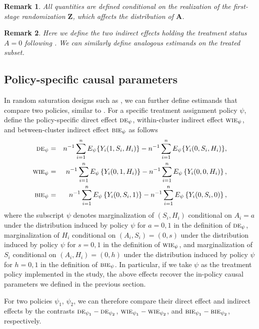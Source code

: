 \documentclass{article}
\newtheorem{remark}{Remark}[section]
\newcommand{\bZ}{\boldsymbol{Z}}
\newcommand{\bA}{\boldsymbol{A}}
\newcommand{\sumi}{\sum_{i=1}^n}
\newcommand{\de}{\textsc{de}}
\newcommand{\bie}{\textsc{bie}}
\newcommand{\wie}{\textsc{wie}}
\begin{document}
\begin{remark}
    All quantities are defined conditional on the realization of the first-stage randomization $\bZ$, which affects the distribution of $\bA$.
\end{remark}

\begin{remark}
    Here we define the two indirect effects holding the treatment status $A=0$ following \cite{hudgens2008toward}. We can similarly define analogous estimands on the treated subset.
\end{remark}

\subsection{Policy-specific causal parameters}
In random saturation designs such as \cite{egger2022general}, we can further define estimands that compare two policies, similar to \cite{hudgens2008toward}. For a specific treatment assignment policy $\psi$, define the policy-specific direct effect $\de_{\psi}$, within-cluster indirect effect $\wie_{\psi}$, and between-cluster indirect effect $\bie_{\psi}$ as follows
\begin{eqnarray*}
    \de_{\psi} &=& n^{-1}\sumi E_{\psi}\{Y_i(1,S_i,H_i)\} - n^{-1}\sumi E_{\psi}\{Y_i(0,S_i,H_i)\}, \\
    \wie_{\psi} &=& n^{-1}\sumi E_{\psi}\left\{Y_{i}(0,1,H_{i})\right\} - n^{-1}\sumi E_{\psi}\left\{Y_{i}(0,0,H_{i})\right\}, \\
    \bie_{\psi} &=& n^{-1}\sumi E_{\psi}\left\{Y_{i}(0,S_{i},1)\right\} - n^{-1}\sumi E_{\psi}\left\{Y_{i}(0,S_{i},0)\right\},
\end{eqnarray*}
where the subscript $\psi$ denotes marginalization of $(S_{i}, H_{i})$ conditional on $A_{i} = a$ under the distribution induced by policy $\psi$ for $a=0,1$ in the definition of $\de_{\psi}$, marginalization of $H_{i}$ conditional on $(A_{i},S_{i}) = (0,s)$ under the distribution induced by policy $\psi$ for $s=0,1$ in the definition of $\wie_{\psi}$, and marginalization of $S_{i}$ conditional on $(A_{i},H_{i}) = (0,h)$ under the distribution induced by policy $\psi$ for $h=0,1$ in the definition of $\bie_{\psi}$. In particular, if we take $\psi$ as the treatment policy implemented in the study, the above effects recover the in-policy causal parameters we defined in the previous section. 

For two policies $\psi_1$, $\psi_2$, we can therefore compare their direct effect and indirect effects by the contrasts $\de_{\psi_1} - \de_{\psi_2}$, $\wie_{\psi_1} - \wie_{\psi_2}$, and $\bie_{\psi_1} - \bie_{\psi_2}$, respectively.
\end{document}

